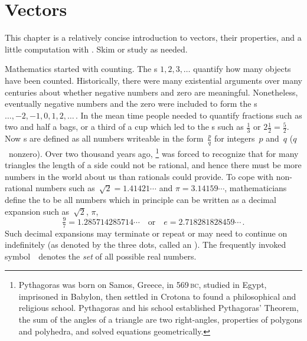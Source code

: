 
\chapter{Vectors}
\label{ch:v}

\minitoc

\begin{comment}
Introduce vectors, lines and planes, including adapting material from parts of Chapter~1 \pooliv{pp.1--55}, Chapter~2 (pre-\S2.1) of the book by \cite{Hopcroft2014},  \holti{\S2.1}, \larsvii{\S4.1} (short), et al.
Also Chapter~13 by \cite{HughesHallett2013}.
\end{comment}



\begin{aside}
This chapter is a relatively concise introduction to vectors, their properties, and a little computation with \script.  
Skim or study as needed.
\end{aside}%
Mathematics started with counting.
The s \(1,2,3,\ldots\) quantify how many objects have been counted.
Historically, there were many existential arguments over many centuries about whether negative numbers and zero are meaningful.
Nonetheless, eventually negative numbers and the zero were included to form the s \(\ldots,-2,-1,0,1,2,\ldots\)\,.
In the mean time people needed to quantify fractions such as two and 
half a bags, or a third of a cup which led to the s such as \(\tfrac13\) or \(2\tfrac12=\tfrac52\). 
Now s are defined as all numbers writeable in the form~\(\tfrac pq\) for integers~\(p\) and~\(q\) (\(q\)~nonzero).
Over two thousand years ago, %
\footnote{Pythagoras was born on Samos, Greece, in 569\,\textsc{bc}, studied in Egypt, imprisoned in Babylon, then settled in Crotona to found a philosophical and religious school.  Pythagoras and his school established Pythagoras' Theorem, the sum of the angles of a triangle are two right-angles, properties of polygons and polyhedra, and solved equations geometrically.}
was forced to recognize that for many triangles the length of a side could not be rational, and hence there must be more numbers in the world about us than rationals could provide.
To cope with non-rational numbers such as~\(\sqrt2=1.41421\cdots\) and \(\pi=3.14159\cdots\), mathematicians define the  to be all numbers which in principle can be written as a decimal expansion such as~\(\sqrt2\), \(\pi\),
\begin{equation*}
\tfrac97=1.285714285714\cdots
\quad\text{or}\quad
e=2.718281828459\cdots\,.
\end{equation*}
Such decimal expansions may terminate or repeat or may need to continue on indefinitely (as denoted by the three dots, called an ).
The frequently invoked symbol~\RR\ denotes the \emph{set} of all possible real numbers.

